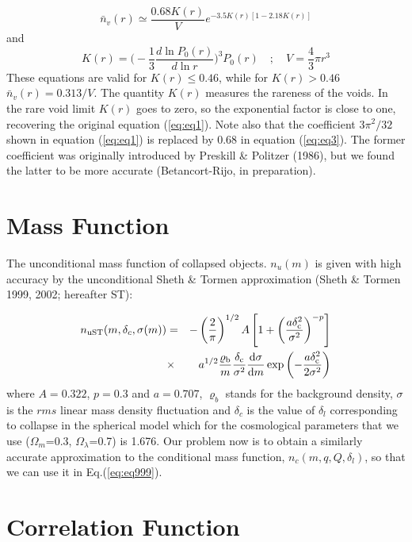 \begin{equation}
\bar{n}_{v}(r) \simeq \frac{0.68K(r)}{V} e^{-3.5K(r)[1-2.18K(r)]} \label{eq:eq3}
\end{equation}
and
\begin{equation}
K(r)=\bigg(-\frac{1}{3}\frac{d\ln P_{0}(r)}{d\ln r}\bigg)^3 P_{0}(r) \quad;\quad V=\frac{4}{3}\pi r^3 \label{eq:eq4}
\end{equation}
These equations are valid for $K(r) \leq 0.46$, while for $K(r)> 0.46$ $\bar{n}_{v}(r)=0.313/V$. The quantity $K(r)$ measures the rareness of the voids. 
In the rare void limit $K(r)$ goes to zero, so the exponential factor is close to one, recovering the original equation (\ref{eq:eq1}). Note also that 
the coefficient $3\pi^2/32$ shown in equation (\ref{eq:eq1}) is replaced by 0.68 in equation (\ref{eq:eq3}). The former coefficient was originally introduced 
by Preskill \& Politzer (1986), but we found the latter to be more accurate (Betancort-Rijo, in preparation). 

\section{Mass Function}
The unconditional mass function of collapsed objects. $n_{u}(m)$ is given with high accuracy 
by the unconditional Sheth \& Tormen approximation (Sheth \& Tormen 1999, 2002; hereafter ST):

\begin{eqnarray}
    n_{\rm uST}(m,\delta_{c},\sigma(m)) &=& - \left( \frac{2}{\pi} \right)^{1/2}
    A \left[ 1 + \left( \frac{a \delta_{\rm c}^2}{\sigma^2} \right)^{-p}
    \right]  \label{eq:eq10} \\
    & \times& a^{1/2} \frac{\varrho_{\rm b}}{m}
    \frac{\delta_{\rm c}}{\sigma^2} \frac{{\rm d} \sigma}{{\rm d} m}
    \exp \left( - \frac{a \delta_{\rm c}^2}{2 \sigma^2} \right)   \nonumber
\end{eqnarray}
where $A=0.322$, $p=0.3$ and $a=0.707$, $\varrho_b$ stands for the background density,
$\sigma$ is the $rms$ linear mass density fluctuation and $\delta_c$ is the value of 
$\delta_l$ corresponding to collapse in the spherical model which for the cosmological 
parameters that we use ($\Omega_m$=0.3, $\Omega_\lambda$=0.7) is 1.676.
Our problem now is to obtain a similarly accurate approximation to the
conditional mass function, $n_{c}(m,q,Q,\delta_{l})$, so that we can use it in Eq.(\ref{eq:eq999}).

\section{Correlation Function}

